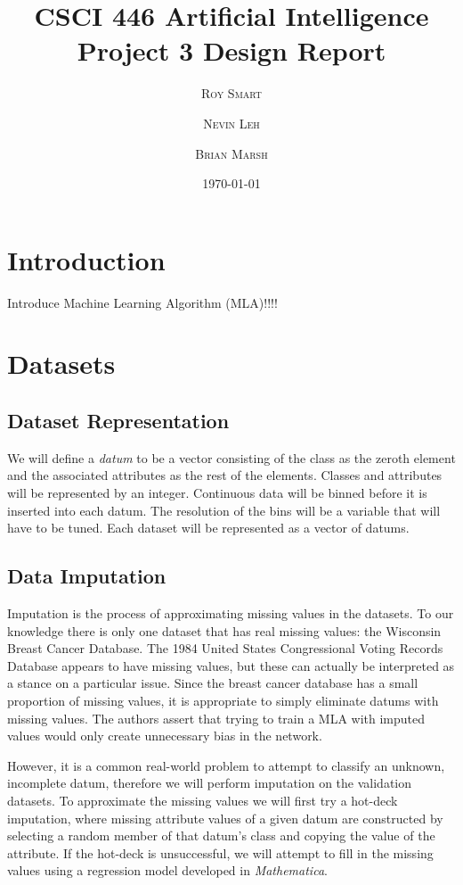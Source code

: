 \documentclass{article}
\title{\vspace{-15mm}\fontsize{24pt}{10pt}\selectfont\textbf{CSCI 446 Artificial Intelligence \\[2mm] Project 3 Design Report} } %
\date{\today}
\author{
\large
\textsc{Roy Smart} \and \textsc{Nevin Leh} \and \textsc{Brian Marsh}\\[2mm] %
}
\begin{document}
	\maketitle %
	\thispagestyle{fancy} %
	\normalsize

	\section{Introduction}
	Introduce Machine Learning Algorithm (MLA)!!!!
	\section{Datasets}
		\subsection{Dataset Representation}
			We will define a \textit{datum} to be a vector consisting of the class as the zeroth element and the associated attributes as the rest of the elements. Classes and attributes will be represented by an integer. Continuous data will be binned before it is inserted into each datum. The resolution of the bins will be a variable that will have to be tuned. Each dataset will be represented as a vector of datums.
		\subsection{Data Imputation}
			Imputation is the process of approximating missing values in the datasets. 
			To our knowledge there is only one dataset that has real missing values: the Wisconsin Breast Cancer Database. 
			The 1984 United States Congressional Voting Records Database appears to have missing values, but these can actually be interpreted as a stance on a particular issue. 
			Since the breast cancer database has a small proportion of missing values, it is appropriate to simply eliminate datums with missing values. 
			The authors assert that trying to train a MLA with imputed values would only create unnecessary bias in the network.
			
			However, it is a common real-world problem to attempt to classify an unknown, incomplete datum, therefore we will perform imputation on the validation datasets. 
			To approximate the missing values we will first try a hot-deck imputation, where missing attribute values of a given datum are constructed by selecting a random member of that datum's class and copying the value of the attribute. 
			If the hot-deck is unsuccessful, we will attempt to fill in the missing values using a regression model developed in \textit{Mathematica}.
\end{document}
